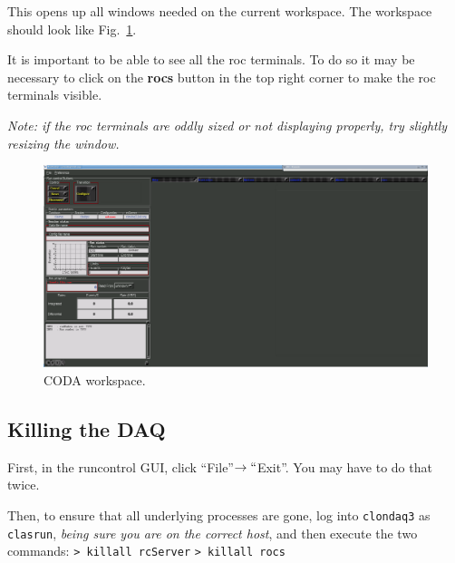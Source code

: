 \documentclass[12pt]{article}
\begin{document}
This opens up all windows needed on the current workspace. The workspace should look like Fig.~\ref{fig:coda}.

It is important to be able to see all the roc terminals.  To do so it may be necessary to click on the {\bf rocs} button in the top right corner to make the roc terminals visible.

{\em Note:  if the roc terminals are oddly sized or not displaying properly, try slightly resizing the window.}
\begin{figure}[htbp]
\begin{center}
    \includegraphics[width=\textwidth]{runcontrol_start.png}
\caption{CODA workspace.}
\label{fig:coda}
\end{center}
\vspace*{-5mm}
\end{figure}

\subsection{Killing the DAQ}\label{sec:daqexit}
First, in the runcontrol GUI, click ``File''$\to``$Exit''.  You may have to do that twice.

Then, to ensure that all underlying processes are gone, log into \texttt{clondaq3} as \texttt{clasrun}, {\em being sure you are on the correct host}, and then execute the two commands:\newline
\texttt{> killall rcServer}\newline
\texttt{> killall rocs}\newline
\end{document}
